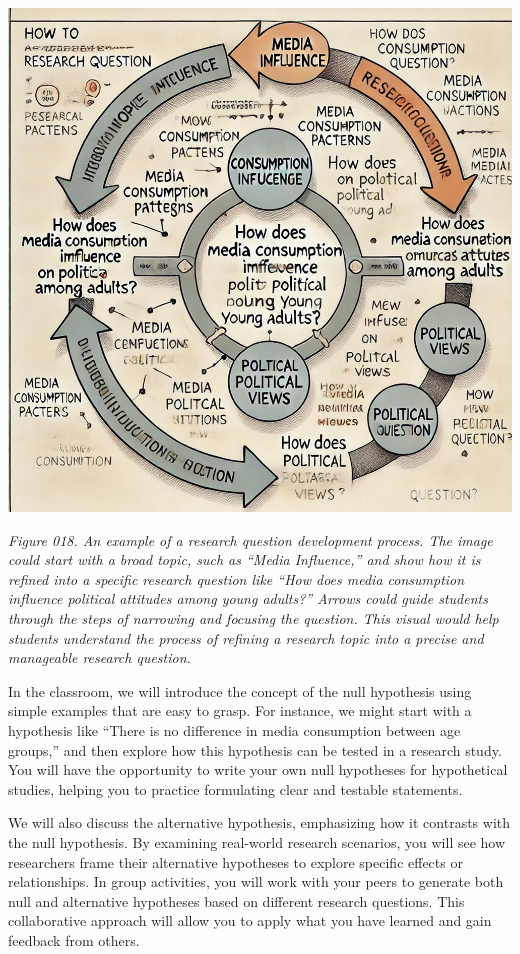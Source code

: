 \documentclass[
]{book}
\begin{document}
\includegraphics[width=1\linewidth,height=\textheight,keepaspectratio]{images/fig018.jpg}

\emph{Figure 018. An example of a research question development process. The image could start with a broad topic, such as ``Media Influence,'' and show how it is refined into a specific research question like ``How does media consumption influence political attitudes among young adults?'' Arrows could guide students through the steps of narrowing and focusing the question. This visual would help students understand the process of refining a research topic into a precise and manageable research question.}

In the classroom, we will introduce the concept of the null hypothesis using simple examples that are easy to grasp. For instance, we might start with a hypothesis like ``There is no difference in media consumption between age groups,'' and then explore how this hypothesis can be tested in a research study. You will have the opportunity to write your own null hypotheses for hypothetical studies, helping you to practice formulating clear and testable statements.

We will also discuss the alternative hypothesis, emphasizing how it contrasts with the null hypothesis. By examining real-world research scenarios, you will see how researchers frame their alternative hypotheses to explore specific effects or relationships. In group activities, you will work with your peers to generate both null and alternative hypotheses based on different research questions. This collaborative approach will allow you to apply what you have learned and gain feedback from others.
\end{document}
